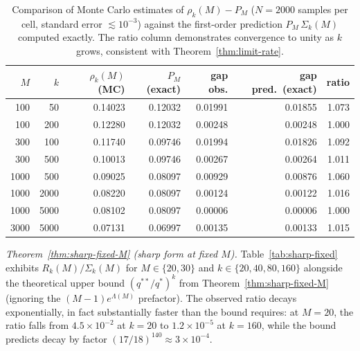 \documentclass[11pt]{article}
\theoremstyle{remark}
\begin{document}
\begin{table}[!htbp]
\centering
\caption{Comparison of Monte Carlo estimates of $\rho_k(M) - P_M$ ($N = 2000$ samples per cell, standard error $\lesssim 10^{-3}$) against the first-order prediction $P_M\, \Sigma_k(M)$ computed exactly. The ratio column demonstrates convergence to unity as $k$ grows, consistent with Theorem~\ref{thm:limit-rate}.}
\label{tab:thm2}
\begin{tabular}{rrrrrrr}
\toprule
$M$ & $k$ & $\rho_k(M)$ (MC) & $P_M$ (exact) & gap obs. & gap pred.\ (exact) & ratio \\
\midrule
100 & 50 & 0.14023 & 0.12032 & 0.01991 & 0.01855 & 1.073 \\
100 & 200 & 0.12280 & 0.12032 & 0.00248 & 0.00248 & 1.000 \\
300 & 100 & 0.11740 & 0.09746 & 0.01994 & 0.01826 & 1.092 \\
300 & 500 & 0.10013 & 0.09746 & 0.00267 & 0.00264 & 1.011 \\
1000 & 500 & 0.09025 & 0.08097 & 0.00929 & 0.00876 & 1.060 \\
1000 & 2000 & 0.08220 & 0.08097 & 0.00124 & 0.00122 & 1.016 \\
1000 & 5000 & 0.08102 & 0.08097 & 0.00006 & 0.00006 & 1.000 \\
3000 & 5000 & 0.07131 & 0.06997 & 0.00135 & 0.00133 & 1.015 \\
\bottomrule
\end{tabular}
\end{table}

\emph{Theorem~\ref{thm:sharp-fixed-M} (sharp form at fixed $M$).} Table~\ref{tab:sharp-fixed} exhibits $R_k(M)/\Sigma_k(M)$ for $M \in \{20, 30\}$ and $k \in \{20, 40, 80, 160\}$ alongside the theoretical upper bound $(q^{**}/q^{*})^k$ from Theorem~\ref{thm:sharp-fixed-M} (ignoring the $(M-1)e^{\Lambda(M)}$ prefactor). The observed ratio decays exponentially, in fact substantially faster than the bound requires: at $M=20$, the ratio falls from $4.5 \times 10^{-2}$ at $k=20$ to $1.2 \times 10^{-5}$ at $k=160$, while the bound predicts decay by factor $(17/18)^{140} \approx 3 \times 10^{-4}$.
\end{document}
